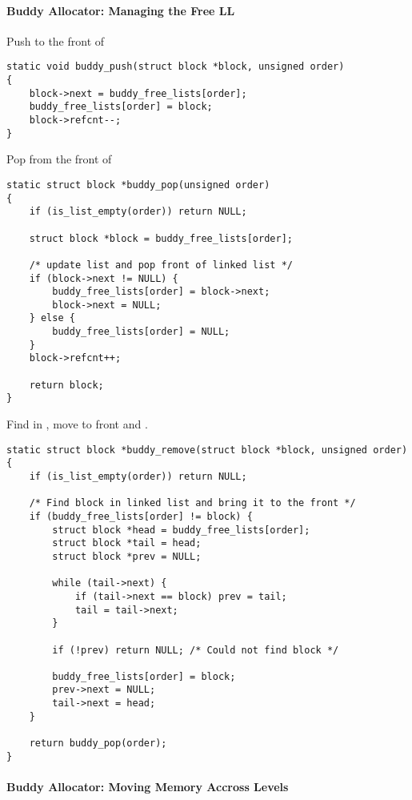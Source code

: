 \paragraph{Buddy Allocator: Managing the Free LL}

Push to the front of 
\begin{lstlisting}[style=bright_C++]
static void buddy_push(struct block *block, unsigned order)
{
	block->next = buddy_free_lists[order];
	buddy_free_lists[order] = block;
	block->refcnt--;
}
\end{lstlisting}

\newpar{}

Pop from the front of 
\begin{lstlisting}[style=bright_C++]
static struct block *buddy_pop(unsigned order)
{
    if (is_list_empty(order)) return NULL;

    struct block *block = buddy_free_lists[order];

    /* update list and pop front of linked list */
    if (block->next != NULL) {
        buddy_free_lists[order] = block->next;
        block->next = NULL;
    } else {
        buddy_free_lists[order] = NULL;
    }
    block->refcnt++;

    return block;
}
\end{lstlisting}

\newpar{}

Find  in  , move to front and .
\begin{lstlisting}[style=bright_C++]
static struct block *buddy_remove(struct block *block, unsigned order)
{
	if (is_list_empty(order)) return NULL;

	/* Find block in linked list and bring it to the front */
	if (buddy_free_lists[order] != block) {
		struct block *head = buddy_free_lists[order];
		struct block *tail = head;
		struct block *prev = NULL;

		while (tail->next) {
			if (tail->next == block) prev = tail;
			tail = tail->next;
		}

		if (!prev) return NULL; /* Could not find block */

		buddy_free_lists[order] = block;
		prev->next = NULL;
		tail->next = head;
	}

	return buddy_pop(order);
}
\end{lstlisting}

\paragraph{Buddy Allocator: Moving Memory Accross Levels}

